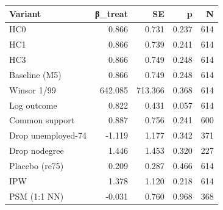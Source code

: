 \begin{tabular}{lrrrr}
\toprule
Variant & β_treat & SE & p & N \\
\midrule
HC0 & 0.866 & 0.731 & 0.237 & 614 \\
HC1 & 0.866 & 0.739 & 0.241 & 614 \\
HC3 & 0.866 & 0.749 & 0.248 & 614 \\
Baseline (M5) & 0.866 & 0.749 & 0.248 & 614 \\
Winsor 1/99 & 642.085 & 713.366 & 0.368 & 614 \\
Log outcome & 0.822 & 0.431 & 0.057 & 614 \\
Common support & 0.887 & 0.756 & 0.241 & 600 \\
Drop unemployed-74 & -1.119 & 1.177 & 0.342 & 371 \\
Drop nodegree & 1.446 & 1.453 & 0.320 & 227 \\
Placebo (re75) & 0.209 & 0.287 & 0.466 & 614 \\
IPW & 1.378 & 1.120 & 0.218 & 614 \\
PSM (1:1 NN) & -0.031 & 0.760 & 0.968 & 368 \\
\bottomrule
\end{tabular}
